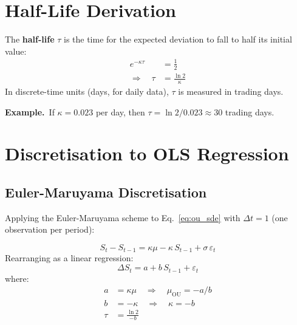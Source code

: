 \documentclass[10pt,a4paper,twocolumn]{article}
\begin{document}
\section{Half-Life Derivation}

\begin{tcolorbox}[mathbox={Formula 3 --- Half-Life Definition}]
\vspace{-4pt}
The \textbf{half-life} $\tau$ is the time for the expected deviation to
fall to half its initial value:
\begin{align}
  e^{-\kappa\tau} &= \tfrac{1}{2} \\
  \Rightarrow\quad \tau &= \frac{\ln 2}{\kappa}
    \label{eq:halflife}
\end{align}
\vspace{-4pt}
In discrete-time units (days, for daily data), $\tau$ is measured in
trading days.
\end{tcolorbox}

\noindent\textbf{Example.}~If $\kappa = 0.023$ per day, then
$\tau = \ln 2 / 0.023 \approx 30$ trading days.

\section{Discretisation to OLS Regression}

\subsection{Euler-Maruyama Discretisation}

Applying the Euler-Maruyama scheme to Eq.~\eqref{eq:ou_sde} with
$\Delta t = 1$ (one observation per period):

\begin{tcolorbox}[mathbox={Formula 4 --- Discrete OU}]
\vspace{-4pt}
\begin{equation}
  S_t - S_{t-1} = \kappa\mu - \kappa\,S_{t-1} + \sigma\,\varepsilon_t
\end{equation}
Rearranging as a linear regression:
\begin{equation}\label{eq:ou_ols}
  \Delta S_t = a + b\,S_{t-1} + \varepsilon_t
\end{equation}
where:
\begin{align}
  a &= \kappa\mu \quad\Rightarrow\quad \mu_{\text{OU}} = -a/b \\
  b &= -\kappa  \quad\Rightarrow\quad \kappa = -b \\
  \tau &= \frac{\ln 2}{-b}
\end{align}
\vspace{-4pt}
\end{tcolorbox}
\end{document}
